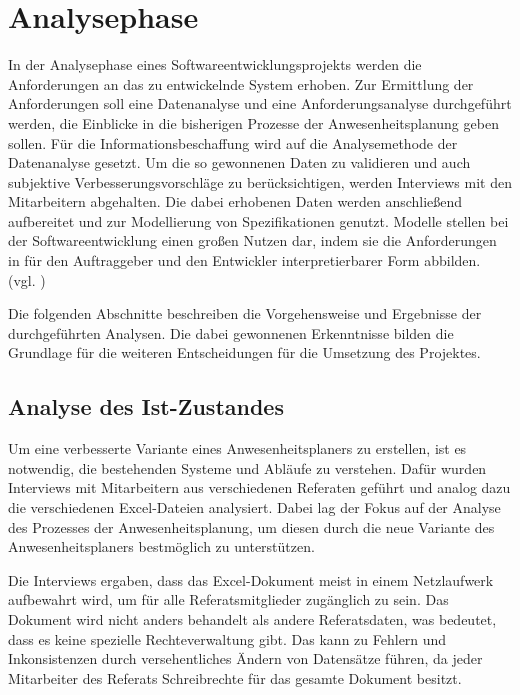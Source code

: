\section{Analysephase}
\label{sec:Analysephase}
In der Analysephase eines Softwareentwicklungsprojekts werden die Anforderungen an das zu entwickelnde System erhoben. Zur Ermittlung der Anforderungen soll eine Datenanalyse und eine Anforderungsanalyse durchgeführt werden, die Einblicke in die bisherigen Prozesse der Anwesenheitsplanung geben sollen. Für die Informationsbeschaffung wird auf die Analysemethode der Datenanalyse gesetzt. Um die so gewonnenen Daten zu validieren und auch subjektive Verbesserungsvorschläge zu berücksichtigen, werden Interviews mit den Mitarbeitern abgehalten. Die dabei erhobenen Daten werden anschließend aufbereitet und zur Modellierung von Spezifikationen genutzt. Modelle stellen bei der Softwareentwicklung einen großen Nutzen dar, indem sie die Anforderungen in für den Auftraggeber und den Entwickler interpretierbarer Form abbilden. (vgl. \cite[S. 43]{dumke-2003})

Die folgenden Abschnitte beschreiben die Vorgehensweise und Ergebnisse der durchgeführten Analysen. Die dabei gewonnenen Erkenntnisse bilden die Grundlage für die weiteren Entscheidungen für die Umsetzung des Projektes.


\subsection{Analyse des Ist-Zustandes}
\label{sec:Ist-Zustand}
Um eine verbesserte Variante eines Anwesenheitsplaners zu erstellen, ist es notwendig, die bestehenden Systeme und Abläufe zu verstehen. Dafür wurden Interviews mit Mitarbeitern aus verschiedenen Referaten geführt und analog dazu die verschiedenen Excel-Dateien analysiert. Dabei lag der Fokus auf der Analyse des Prozesses der Anwesenheitsplanung, um diesen durch die neue Variante des Anwesenheitsplaners bestmöglich zu unterstützen.

Die Interviews ergaben, dass das Excel-Dokument meist in einem Netzlaufwerk aufbewahrt wird, um für alle Referatsmitglieder zugänglich zu sein. Das Dokument wird nicht anders behandelt als andere Referatsdaten, was bedeutet, dass es keine spezielle Rechteverwaltung gibt. Das kann zu Fehlern und Inkonsistenzen durch versehentliches Ändern von Datensätze führen, da jeder Mitarbeiter des Referats Schreibrechte für das gesamte Dokument besitzt.

